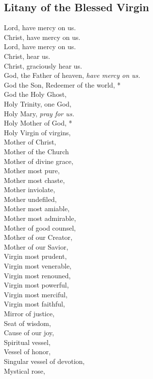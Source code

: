 \documentclass[9pt]{article}
\begin{document}
\begin{multicols}{3}
\subsection*{Litany of the Blessed Virgin}

Lord, have mercy on us.\\
Christ, have mercy on us.\\
Lord, have mercy on us.\\
Christ, hear us.\\
Christ, graciously hear us.\\
God, the Father of heaven, \textit{have mercy on us.}\\
God the Son, Redeemer of the world, *\\
God the Holy Ghost,\\
Holy Trinity, one God,\\
Holy Mary, \textit{pray for us.}\\
Holy Mother of God, *\\
Holy Virgin of virgins,\\
Mother of Christ,\\
Mother of the Church\\
Mother of divine grace,\\
Mother most pure,\\
Mother most chaste,\\
Mother inviolate,\\
Mother undefiled,\\
Mother most amiable,\\
Mother most admirable,\\
Mother of good counsel,\\
Mother of our Creator,\\
Mother of our Savior,\\
Virgin most prudent,\\
Virgin most venerable,\\
Virgin most renouned,\\
Virgin most powerful,\\
Virgin most merciful,\\
Virgin most faithful,\\
Mirror of justice,\\
Seat of wisdom,\\
Cause of our joy,\\
Spiritual vessel,\\
Vessel of honor,\\
Singular vessel of devotion,\\
Mystical rose,\\

\end{multicols}
\end{document}
